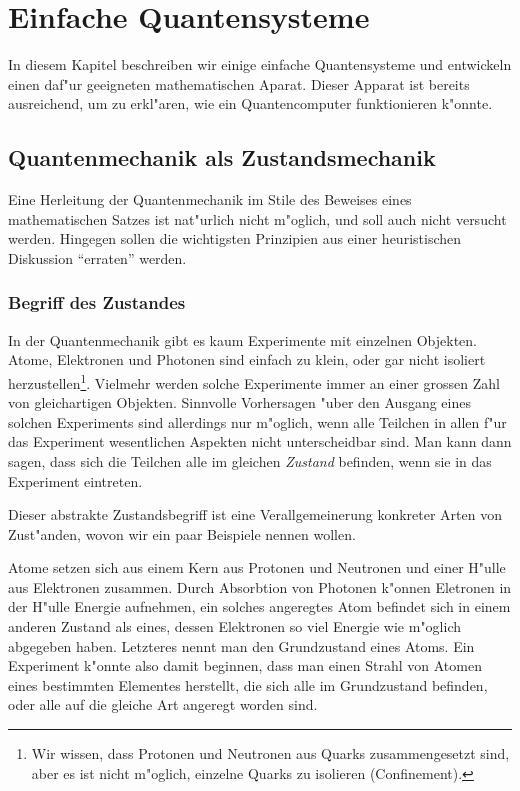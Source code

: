 \chapter{Einfache Quantensysteme\label{chapter:einfache-quantensysteme}}
\rhead{}
In diesem Kapitel beschreiben wir einige einfache Quantensysteme und
entwickeln einen daf"ur geeigneten mathematischen Aparat. Dieser
Apparat ist bereits ausreichend, um zu erkl"aren, wie ein Quantencomputer
funktionieren k"onnte.

\section{Quantenmechanik als Zustandsmechanik}
Eine Herleitung der Quantenmechanik im Stile des Beweises eines mathematischen
Satzes ist nat"urlich nicht m"oglich, und soll auch nicht versucht werden.
Hingegen sollen die wichtigsten Prinzipien aus einer heuristischen
Diskussion ``erraten'' werden. 

\subsection{Begriff des Zustandes}
In der Quantenmechanik gibt es kaum Experimente mit einzelnen Objekten.
Atome, Elektronen und Photonen sind einfach zu klein, oder gar nicht
isoliert herzustellen\footnote{Wir wissen, dass Protonen und Neutronen aus
Quarks zusammengesetzt sind, aber es ist nicht m"oglich, einzelne Quarks
zu isolieren (Confinement).}.
Vielmehr werden solche Experimente immer
an einer grossen Zahl von gleichartigen Objekten.
Sinnvolle Vorhersagen "uber den Ausgang eines solchen Experiments
sind allerdings nur m"oglich, wenn alle
Teilchen in allen f"ur das Experiment wesentlichen Aspekten
nicht unterscheidbar sind. Man kann dann sagen, dass sich die
Teilchen alle im gleichen {\em Zustand} befinden, wenn sie in
das Experiment eintreten.

Dieser abstrakte Zustandsbegriff ist eine Verallgemeinerung konkreter
Arten von Zust"anden, wovon wir ein paar Beispiele nennen wollen.

Atome setzen sich aus einem Kern aus Protonen und Neutronen und einer
H"ulle aus Elektronen zusammen. Durch Absorbtion von Photonen k"onnen
Eletronen in der H"ulle Energie aufnehmen, ein solches angeregtes
Atom befindet sich in einem anderen Zustand als eines, dessen Elektronen
so viel Energie wie m"oglich abgegeben haben. Letzteres nennt man
den Grundzustand eines Atoms. Ein Experiment k"onnte also damit beginnen,
dass man einen Strahl von Atomen eines bestimmten Elementes herstellt,
die sich alle im Grundzustand befinden, oder alle auf die gleiche Art
angeregt worden sind.

